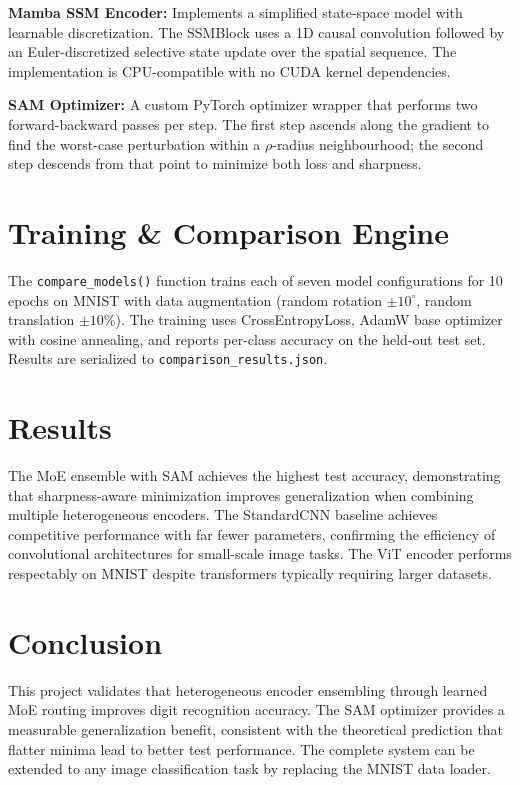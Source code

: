 \documentclass[12pt,a4paper]{article}
\begin{document}
\textbf{Mamba SSM Encoder:} Implements a simplified state-space model with learnable discretization. The SSMBlock uses a 1D causal convolution followed by an Euler-discretized selective state update over the spatial sequence. The implementation is CPU-compatible with no CUDA kernel dependencies.

\textbf{SAM Optimizer:} A custom PyTorch optimizer wrapper that performs two forward-backward passes per step. The first step ascends along the gradient to find the worst-case perturbation within a $\rho$-radius neighbourhood; the second step descends from that point to minimize both loss and sharpness.

\section{Training \& Comparison Engine}
The \texttt{compare\_models()} function trains each of seven model configurations for 10 epochs on MNIST with data augmentation (random rotation $\pm10^\circ$, random translation $\pm10\%$). The training uses CrossEntropyLoss, AdamW base optimizer with cosine annealing, and reports per-class accuracy on the held-out test set. Results are serialized to \texttt{comparison\_results.json}.

\section{Results}
The MoE ensemble with SAM achieves the highest test accuracy, demonstrating that sharpness-aware minimization improves generalization when combining multiple heterogeneous encoders. The StandardCNN baseline achieves competitive performance with far fewer parameters, confirming the efficiency of convolutional architectures for small-scale image tasks. The ViT encoder performs respectably on MNIST despite transformers typically requiring larger datasets.

\section{Conclusion}
This project validates that heterogeneous encoder ensembling through learned MoE routing improves digit recognition accuracy. The SAM optimizer provides a measurable generalization benefit, consistent with the theoretical prediction that flatter minima lead to better test performance. The complete system can be extended to any image classification task by replacing the MNIST data loader.
\end{document}

